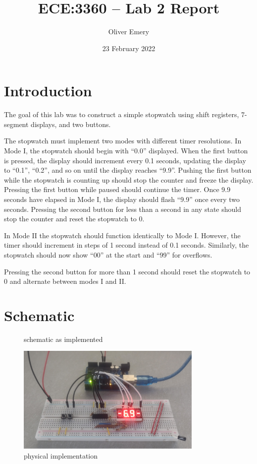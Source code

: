 \documentclass[12pt,letterpaper]{article}
\title{ECE:3360 -- Lab 2 Report}
\author{Oliver Emery}
\date{23 February 2022}
\begin{document}
\maketitle

\section{Introduction}
The goal of this lab was to construct a simple stopwatch using shift registers,
7-segment displays, and two buttons.
\par The stopwatch must implement two modes with different timer resolutions.
In Mode I, the stopwatch should begin with ``0.0'' displayed. When the first
button is pressed, the display should increment every 0.1 seconds, updating the
display to ``0.1'', ``0.2'', and so on until the display reaches ``9.9''.
Pushing the first button while the stopwatch is counting up should stop the
counter and freeze the display. Pressing the first button while paused should
continue the timer. Once 9.9 seconds have elapsed in Mode I, the display should
flash ``9.9'' once every two seconds. Pressing the second button for less than a
second in any state should stop the counter and reset the stopwatch to 0.
\par In Mode II the stopwatch should function identically to Mode I. However,
the timer should increment in steps of 1 second instead of 0.1 seconds.
Similarly, the stopwatch should now show ``00'' at the start and ``99'' for
overflows.
\par Pressing the second button for more than 1 second should reset the
stopwatch to 0 and alternate between modes I and II.

\section{Schematic}
\begin{figure}[H]
	\centering
	
	\caption{schematic as implemented}
\end{figure}
\begin{figure}[H]
	\centering
	\includegraphics[width=0.8\textwidth]{images/implementation.jpg}
	\caption{physical implementation}
\end{figure}
\end{document}

